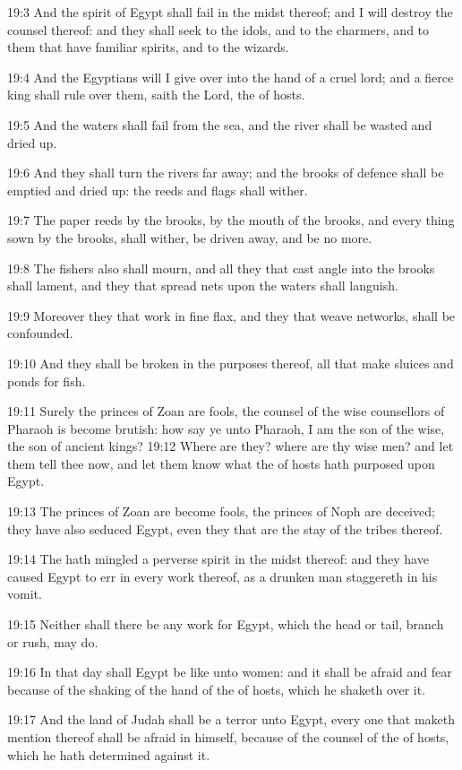 19:3 And the spirit of Egypt shall fail in the midst thereof; and I will destroy the counsel thereof: and they shall seek to the idols, and to the charmers, and to them that have familiar spirits, and to the wizards.

19:4 And the Egyptians will I give over into the hand of a cruel lord; and a fierce king shall rule over them, saith the Lord, the \LORD of hosts.

19:5 And the waters shall fail from the sea, and the river shall be wasted and dried up.

19:6 And they shall turn the rivers far away; and the brooks of defence shall be emptied and dried up: the reeds and flags shall wither.

19:7 The paper reeds by the brooks, by the mouth of the brooks, and every thing sown by the brooks, shall wither, be driven away, and be no more.

19:8 The fishers also shall mourn, and all they that cast angle into the brooks shall lament, and they that spread nets upon the waters shall languish.

19:9 Moreover they that work in fine flax, and they that weave networks, shall be confounded.

19:10 And they shall be broken in the purposes thereof, all that make sluices and ponds for fish.

19:11 Surely the princes of Zoan are fools, the counsel of the wise counsellors of Pharaoh is become brutish: how say ye unto Pharaoh, I am the son of the wise, the son of ancient kings?  19:12 Where are they? where are thy wise men? and let them tell thee now, and let them know what the \LORD of hosts hath purposed upon Egypt.

19:13 The princes of Zoan are become fools, the princes of Noph are deceived; they have also seduced Egypt, even they that are the stay of the tribes thereof.

19:14 The \LORD hath mingled a perverse spirit in the midst thereof: and they have caused Egypt to err in every work thereof, as a drunken man staggereth in his vomit.

19:15 Neither shall there be any work for Egypt, which the head or tail, branch or rush, may do.

19:16 In that day shall Egypt be like unto women: and it shall be afraid and fear because of the shaking of the hand of the \LORD of hosts, which he shaketh over it.

19:17 And the land of Judah shall be a terror unto Egypt, every one that maketh mention thereof shall be afraid in himself, because of the counsel of the \LORD of hosts, which he hath determined against it.

